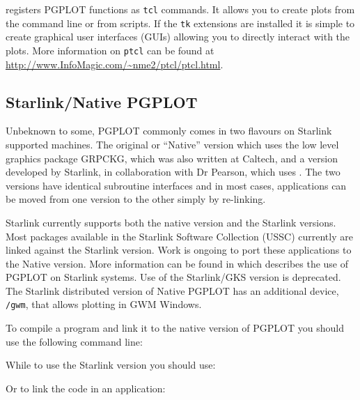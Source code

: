 \documentclass[twoside,11pt]{starlink}
\begin{document}
 registers PGPLOT
functions as \texttt{tcl} commands.  It allows you to create plots from
the command line or from scripts. If the \texttt{tk} extensions are
installed it is simple to create graphical user interfaces (GUIs)
allowing you to directly interact with the plots. More
information on \texttt{ptcl} can be found at \url{http://www.InfoMagic.com/~nme2/ptcl/ptcl.html}.

\subsection{Starlink/Native PGPLOT\label{sc15_pgstar}}

Unbeknown to some, PGPLOT commonly comes in two flavours on Starlink
supported machines. The original or ``Native'' version which uses the
low level graphics package GRPCKG, which was also written at Caltech,
and a version developed by Starlink, in collaboration with Dr Pearson,
which uses . The two versions have
identical subroutine interfaces and in most cases, applications can be
moved from one version to the other simply by re-linking.

Starlink currently supports both the native version and the Starlink
versions. Most packages available in the Starlink Software Collection
(USSC) currently are linked against the Starlink version. Work is
ongoing to port these applications to the Native version. More
information can be found in  which describes the
use of PGPLOT on Starlink systems. Use of the Starlink/GKS version is
deprecated. The Starlink distributed version of Native PGPLOT has an
additional device, \texttt{/gwm}, that allows plotting in GWM Windows.

To compile a program and link it to the native version of PGPLOT you
should use the following command line:

\begin{terminalv}
\end{terminalv}

While to use the Starlink version you should use:

\begin{terminalv}
\end{terminalv}

Or to link the code in an  application:
\end{document}

